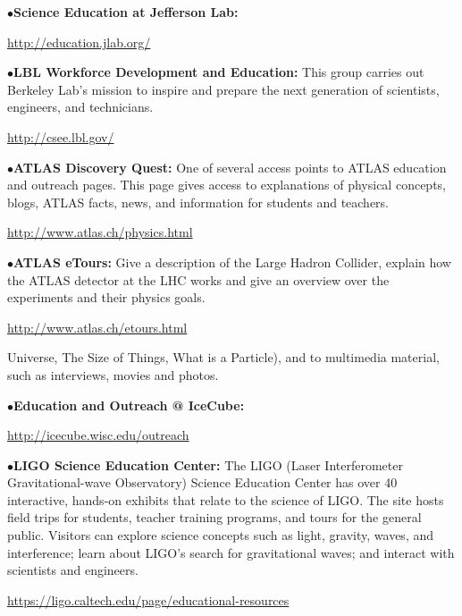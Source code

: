 \smallskip

\item{$\bullet$}{\bf Science Education at Jefferson Lab:} 
	\item{}\qquad\url{http://education.jlab.org/}

\smallskip

\item{$\bullet$}{\bf LBL Workforce Development and Education:} 
This group carries out Berkeley Lab’s mission to inspire and prepare the next generation of scientists, engineers, and technicians.
	\item{}\qquad\url{http://csee.lbl.gov/}

\medskip


\medskip



\medskip

\item{$\bullet$}{\bf ATLAS Discovery Quest:} 
One of several access points to ATLAS education and outreach pages. This page gives access to explanations of physical concepts, blogs, ATLAS facts, news, and information for students and teachers.
   \item{}\qquad\url{http://www.atlas.ch/physics.html}     
\medskip


\item{$\bullet$}{\bf ATLAS eTours:} 
Give a description of the Large Hadron Collider, explain how the ATLAS detector at the LHC works and give an overview over the experiments and their physics goals. 
	\item{}\qquad\url{http://www.atlas.ch/etours.html}

\smallskip

Universe, The Size of Things, What is a Particle), and to multimedia 
material, such as interviews, movies and photos.

\smallskip

\item{$\bullet$}{\bf Education and Outreach @ IceCube:}
    \item{}\qquad\url{http://icecube.wisc.edu/outreach}


\smallskip

\item{$\bullet$}{\bf LIGO Science Education Center:}
The LIGO (Laser Interferometer 
Gravitational-wave Observatory) Science Education Center has over 
40 interactive, hands-on exhibits that relate to the science of LIGO. The 
site hosts field trips for students, teacher training programs, and tours 
for the general public. Visitors can explore science concepts such as 
light, gravity, waves, and interference; learn about LIGO's search for 
gravitational waves; and interact with scientists and engineers.
     \item{}\qquad\url{https://ligo.caltech.edu/page/educational-resources}


